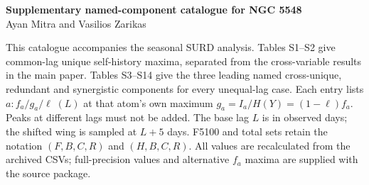 \documentclass[10pt,a4paper]{article}
\begin{document}
\begin{center}
{\large\bfseries Supplementary named-component catalogue for NGC 5548}\\[4pt]
Ayan Mitra and Vasilios Zarikas
\end{center}
This catalogue accompanies the seasonal SURD analysis. Tables S1--S2 give common-lag unique self-history maxima, separated from the cross-variable results in the main paper. Tables S3--S14 give the three leading named cross-unique, redundant and synergistic components for every unequal-lag case. Each entry lists $a:f_a/g_a/\ell\;(L)$ at that atom's own maximum $g_a=I_a/H(Y)=(1-\ell)f_a$. Peaks at different lags must not be added. The base lag $L$ is in observed days; the shifted wing is sampled at $L+5$ days. F5100 and total sets retain the notation $(F,B,C,R)$ and $(H,B,C,R)$. All values are recalculated from the archived CSVs; full-precision values and alternative $f_a$ maxima are supplied with the source package.
\end{document}

